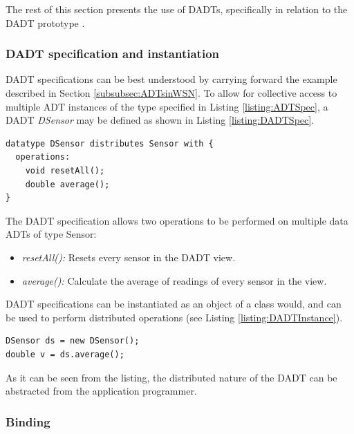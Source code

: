 The rest of this section presents the use of DADTs, specifically in relation to
the DADT prototype \cite{migliavacca_DADT:2006}.

\subsubsection{DADT specification and instantiation} \label{subsubsec:dadtspecandinst}

DADT specifications can be best understood by carrying forward the example
described in Section \ref{subsubsec:ADTsinWSN}. To allow for collective access
to multiple ADT instances of the type specified in Listing
\ref{listing:ADTSpec}, a DADT \emph{DSensor} may be defined as shown in Listing
\ref{listing:DADTSpec}.   
 
\begin{lstlisting}[frame=trbl, basewidth={0.55em, 0.6em}, captionpos=b, 
basicstyle=\ttfamily\footnotesize, breaklines, caption = Data DADT 
specification (reproduced from \cite{migliavacca_DADT:2006}), label = 
listing:DADTSpec]
datatype DSensor distributes Sensor with {
  operations:
	void resetAll();
	double average();
}
\end{lstlisting}

The DADT specification allows two operations to be performed on multiple data 
ADTs of type Sensor:  
\begin{itemize}
\item \emph{resetAll():} Resets every sensor in the DADT view.
\item \emph{average():} Calculate the average of readings of every sensor in the
view.
\end{itemize}

DADT specifications can be instantiated as an object of a class would, and can
be used to perform distributed operations (see Listing \ref{listing:DADTInstance}).

\begin{lstlisting}[frame=trbl, basewidth={0.55em, 0.6em}, captionpos=b, 
basicstyle=\ttfamily\footnotesize, breaklines, caption = DADT Instantiation 
(reproduced from \cite{migliavacca_DADT:2006}), label = listing:DADTInstance ]
DSensor ds = new DSensor();
double v = ds.average();
\end{lstlisting}

As it can be seen from the listing, the distributed nature of the DADT can be
abstracted from the application programmer.

\subsubsection{Binding}

